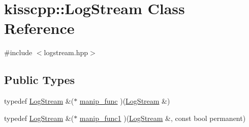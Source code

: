 \hypertarget{a00031}{\section{kisscpp\-:\-:Log\-Stream Class Reference}
\label{a00031}
}


{\ttfamily \#include $<$logstream.\-hpp$>$}

\subsection*{Public Types}
\begin{DoxyCompactItemize}
\item 
typedef \hyperlink{a00031}{Log\-Stream} \&($\ast$ \hyperlink{a00031_abb058ef2b1b57fb7e0b89c3312794ada}{manip\-\_\-func} )(\hyperlink{a00031}{Log\-Stream} \&)
\item 
typedef \hyperlink{a00031}{Log\-Stream} \&($\ast$ \hyperlink{a00031_ab6994c757d4c63c4388a932cf2be2c9d}{manip\-\_\-func1} )(\hyperlink{a00031}{Log\-Stream} \&, const bool permanent)
\end{DoxyCompactItemize}
